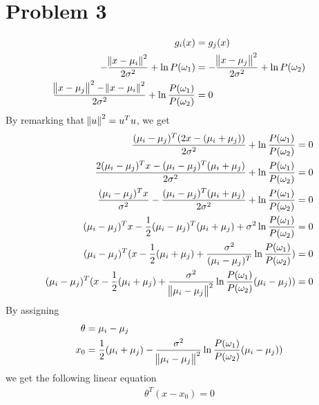 \documentclass[a4paper, 10pt, twoside]{article}
\begin{document}
\section*{Problem 3}
\begin{align*}
    g_i(x)                                                                                                                             & = g_j(x)                                                \\
    -\frac{\norm{x-\mu_i}^2}{2\sigma^2} + \ln P(\omega_1)                                                                              & = -\frac{\norm{x-\mu_j}^2}{2\sigma^2} + \ln P(\omega_2) \\
    \frac{\norm{x-\mu_j}^2 - \norm{x-\mu_i}^2}{2\sigma^2} + \ln \frac{P(\omega_1)}{P(\omega_2)}                                        & = 0 
\end{align*}
By remarking that $\norm{u}^2 = u^Tu$, we get 
\begin{align*}    
    \frac{(\mu_i-\mu_j)^T(2x-(\mu_i+\mu_j))}{2\sigma^2} + \ln \frac{P(\omega_1)}{P(\omega_2)}                                            & = 0                                                     \\
    \frac{2(\mu_i-\mu_j)^Tx-(\mu_i-\mu_j)^T(\mu_i+\mu_j)}{2\sigma^2} + \ln \frac{P(\omega_1)}{P(\omega_2)}                                 & = 0                                                     \\
    \frac{(\mu_i-\mu_j)^Tx}{\sigma^2}-\frac{(\mu_i-\mu_j)^T(\mu_i+\mu_j)}{2\sigma^2} + \ln \frac{P(\omega_1)}{P(\omega_2)}                 & = 0                                                     \\
    (\mu_i-\mu_j)^Tx-\frac{1}{2}(\mu_i-\mu_j)^T(\mu_i+\mu_j) + \sigma^2 \ln \frac{P(\omega_1)}{P(\omega_2)}                                & = 0                                                     \\
    (\mu_i-\mu_j)^T(x-\frac{1}{2}(\mu_i+\mu_j) + \frac{\sigma^2}{(\mu_i-\mu_j)^T} \ln \frac{P(\omega_1)}{P(\omega_2)})                       & = 0                                                     \\
    (\mu_i-\mu_j)^T(x-\frac{1}{2}(\mu_i+\mu_j) + \frac{\sigma^2}{\norm{\mu_i-\mu_j}^2} \ln \frac{P(\omega_1)}{P(\omega_2)}(\mu_i-\mu_j)) & = 0                                                     \\
\end{align*}
By assigning
\begin{align}
    \theta & = \mu_i-\mu_j                                                                                                        \\
    x_0    & = \frac{1}{2}(\mu_i+\mu_j) - \frac{\sigma^2}{\norm{\mu_i-\mu_j}^2} \ln \frac{P(\omega_1)}{P(\omega_2)}(\mu_i-\mu_j))
\end{align}
we get the following linear equation
\begin{align*}
    \theta^T(x-x_0) = 0
\end{align*}
\end{document}
